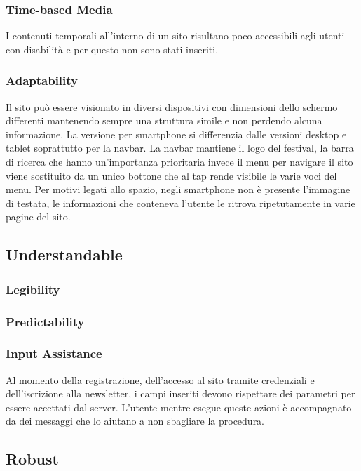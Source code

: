 \documentclass[10pt, a4paper]{article}
\begin{document}
\subsubsection{Time-based Media}
I contenuti temporali all'interno di un sito risultano poco accessibili agli utenti con disabilità e per questo non sono stati inseriti.

\subsubsection{Adaptability}
Il sito può essere visionato in diversi dispositivi con dimensioni dello schermo differenti mantenendo sempre una struttura simile e non perdendo alcuna informazione. La versione per smartphone si differenzia dalle versioni desktop e tablet soprattutto per la navbar. La navbar mantiene il logo del festival, la barra di ricerca che hanno un’importanza prioritaria invece il menu per navigare il sito viene sostituito da un unico bottone che al tap rende visibile le varie voci del menu. Per motivi legati allo spazio, negli smartphone non è presente l’immagine di testata, le informazioni che conteneva l’utente le ritrova ripetutamente in varie pagine del sito.


\subsection{Understandable}

\subsubsection{Legibility}

\subsubsection{Predictability}

\subsubsection{Input Assistance}
Al momento della registrazione, dell’accesso al sito tramite credenziali e dell’iscrizione alla newsletter, i campi inseriti devono rispettare dei parametri per essere accettati dal server. L’utente mentre esegue queste azioni è accompagnato da dei messaggi che lo aiutano a non sbagliare la procedura.

\subsection{Robust}
\end{document}
